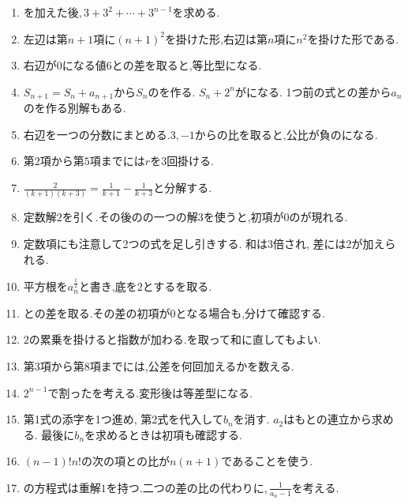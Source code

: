 \begin{enumerate}[label=\textbf{問\arabic*.},leftmargin=3.8em,format=\bookitemlink{practice-basic}{hint}{problem}]
          \item {}を加えた後,\,$3+3^2+\cdots+3^{n-1}$を求める.
          \item 左辺は第$n+1$項に$(n+1)^2$を掛けた形,右辺は第$n$項に$n^2$を掛けた形である.
          \item 右辺が$0$になる値$6$との差を取ると,等比型になる.
          \item $S_{n+1}=S_n+a_{n+1}$から$S_n$のを作る. $S_n+2^n$がになる. 1つ前の式との差から$a_n$のを作る別解もある.
          \item 右辺を一つの分数にまとめる.$3,-1$からの比を取ると,公比が負のになる.
          \item 第$2$項から第$5$項までには$r$を$3$回掛ける.
          \item $\displaystyle \frac{2}{(k+1)(k+3)}=\frac1{k+1}-\frac1{k+3}$と分解する.
          \item 定数解$2$を引く.その後のの一つの解$3$を使うと,初項が$0$のが現れる.
          \item 定数項にも注意して2つの式を足し引きする. 和は3倍され, 差には2が加えられる.
          \item 平方根を$\displaystyle a_n^{\frac{1}{2}}$と書き,底を$2$とするを取る.
          \item {}との差を取る.その差の初項が$0$となる場合も,分けて確認する.
          \item $2$の累乗を掛けると指数が加わる.を取って和に直してもよい.
          \item 第$3$項から第$8$項までには,公差を何回加えるかを数える.
          \item $2^{n-1}$で割ったを考える.変形後は等差型になる.
          \item 第1式の添字を1つ進め, 第2式を代入して$b_n$を消す. $a_2$はもとの連立から求める. 最後に$b_n$を求めるときは初項も確認する.
          \item $(n-1)!n!$の次の項との比が$n(n+1)$であることを使う.
          \item {}の方程式は重解$1$を持つ.二つの差の比の代わりに,\,$\displaystyle \frac{1}{a_n-1}$を考える.

\end{enumerate}
